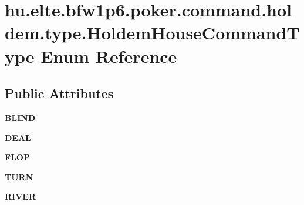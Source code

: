\hypertarget{enumhu_1_1elte_1_1bfw1p6_1_1poker_1_1command_1_1holdem_1_1type_1_1_holdem_house_command_type}{}\section{hu.\+elte.\+bfw1p6.\+poker.\+command.\+holdem.\+type.\+Holdem\+House\+Command\+Type Enum Reference}
\label{enumhu_1_1elte_1_1bfw1p6_1_1poker_1_1command_1_1holdem_1_1type_1_1_holdem_house_command_type}
\subsection*{Public Attributes}
\begin{DoxyCompactItemize}
\item 
\hypertarget{enumhu_1_1elte_1_1bfw1p6_1_1poker_1_1command_1_1holdem_1_1type_1_1_holdem_house_command_type_a980abd1ae011e926c0875d6dfc3e288d}{}{\bfseries B\+L\+I\+N\+D}\label{enumhu_1_1elte_1_1bfw1p6_1_1poker_1_1command_1_1holdem_1_1type_1_1_holdem_house_command_type_a980abd1ae011e926c0875d6dfc3e288d}

\item 
\hypertarget{enumhu_1_1elte_1_1bfw1p6_1_1poker_1_1command_1_1holdem_1_1type_1_1_holdem_house_command_type_afde1e8d3a245a232d5c02215df84871e}{}{\bfseries D\+E\+A\+L}\label{enumhu_1_1elte_1_1bfw1p6_1_1poker_1_1command_1_1holdem_1_1type_1_1_holdem_house_command_type_afde1e8d3a245a232d5c02215df84871e}

\item 
\hypertarget{enumhu_1_1elte_1_1bfw1p6_1_1poker_1_1command_1_1holdem_1_1type_1_1_holdem_house_command_type_a9d1eb32efe2b5593806a5bfc89cb2488}{}{\bfseries F\+L\+O\+P}\label{enumhu_1_1elte_1_1bfw1p6_1_1poker_1_1command_1_1holdem_1_1type_1_1_holdem_house_command_type_a9d1eb32efe2b5593806a5bfc89cb2488}

\item 
\hypertarget{enumhu_1_1elte_1_1bfw1p6_1_1poker_1_1command_1_1holdem_1_1type_1_1_holdem_house_command_type_adcd36fbd90425f32948e972190d7d5fd}{}{\bfseries T\+U\+R\+N}\label{enumhu_1_1elte_1_1bfw1p6_1_1poker_1_1command_1_1holdem_1_1type_1_1_holdem_house_command_type_adcd36fbd90425f32948e972190d7d5fd}

\item 
\hypertarget{enumhu_1_1elte_1_1bfw1p6_1_1poker_1_1command_1_1holdem_1_1type_1_1_holdem_house_command_type_a6f36204823b748e39e4a7f6138b7e9ab}{}{\bfseries R\+I\+V\+E\+R}\label{enumhu_1_1elte_1_1bfw1p6_1_1poker_1_1command_1_1holdem_1_1type_1_1_holdem_house_command_type_a6f36204823b748e39e4a7f6138b7e9ab}

\end{DoxyCompactItemize}


